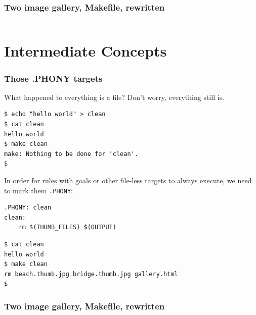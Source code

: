 \documentclass[xcolor=dvipsnames,t,compress]{beamer}
\begin{document}
\begin{frame}[fragile]
\frametitle{Two image gallery, Makefile, rewritten}
\vspace{-1em}
\inputminted[fontsize=\small,frame=single,tabsize=4]{make}{examples/make/Makefile.7}
\end{frame}



\section{Intermediate Concepts}

\begin{frame}[fragile]
\frametitle{Those .PHONY targets}
\vspace{-1em}
What happened to everything is a file? Don't worry, everything still is.
\begin{verbatim}
$ echo "hello world" > clean
$ cat clean
hello world
$ make clean
make: Nothing to be done for 'clean'.
$
\end{verbatim}
\pause
In order for rules with goals or other file-less targets to always execute, we need to mark them \texttt{.PHONY}:
\begin{verbatim}
.PHONY: clean
clean:
	rm $(THUMB_FILES) $(OUTPUT)
\end{verbatim}
\begin{verbatim}
$ cat clean
hello world
$ make clean
rm beach.thumb.jpg bridge.thumb.jpg gallery.html
$
\end{verbatim}
\end{frame}

\begin{frame}[fragile]
\frametitle{Two image gallery, Makefile, rewritten}
\vspace{-1em}
\inputminted[fontsize=\footnotesize,frame=single,tabsize=4]{make}{examples/make/Makefile.8}
\end{frame}
\end{document}
